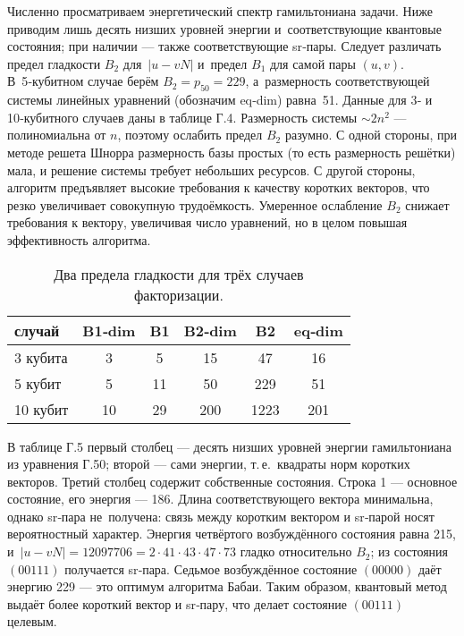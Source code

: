 Численно просматриваем энергетический спектр гамильтониана задачи. Ниже
приводим лишь десять низших уровней энергии и~соответствующие квантовые
состояния; при наличии — также соответствующие sr‑пары. Следует различать
предел гладкости $B_{2}$ для~$|u-vN|$ и~предел $B_{1}$ для самой пары $(u,v)$.
В~5‑кубитном случае берём $B_{2}=p_{50}=229$, а~размерность соответствующей
системы линейных уравнений (обозначим eq‑dim) равна~51. Данные для 3‑ и
10‑кубитного случаев даны в таблице Г.4. Размерность системы $\sim 2n^{2}$ —
полиномиальна от $n$, поэтому ослабить предел $B_{2}$ разумно. С одной стороны,
при методе решета Шнорра размерность базы простых (то есть размерность решётки)
мала, и решение системы требует небольших ресурсов. С другой стороны, алгоритм
предъявляет высокие требования к качеству коротких векторов, что резко
увеличивает совокупную трудоёмкость. Умеренное ослабление $B_{2}$ снижает
требования к вектору, увеличивая число уравнений, но в целом повышая
эффективность алгоритма.

\begin{table}[h]
    \centering
    \caption{
Два предела гладкости для трёх случаев факторизации.
    }
\begin{tabular}{@{}lccccc@{}}
\hline\hline
\textbf{случай} & \textbf{B1‑dim} & \textbf{B1} &
\textbf{B2‑dim} & \textbf{B2} & \textbf{eq‑dim} \\ \hline
3 кубита  & 3  &  5 &  15 &   47 &  16 \\
5 кубит   & 5  & 11 &  50 &  229 &  51 \\
10 кубит  & 10 & 29 & 200 & 1223 & 201 \\
\hline\hline
\end{tabular}
    \label{tab:tab6}
\end{table}

В таблице Г.5 первый столбец — десять низших уровней энергии гамильтониана
из уравнения Г.50; второй — сами энергии, т.\,е.\ квадраты норм коротких
векторов. Третий столбец содержит собственные состояния. Строка 1 — основное
состояние, его энергия — 186. Длина соответствующего вектора минимальна, однако
sr‑пара не~получена: связь между коротким вектором и sr‑парой носят
вероятностный характер. Энергия четвёртого возбуждённого состояния равна 215,
и~$|u-vN|=12097706= 2\!\cdot\!41\!\cdot\!43\!\cdot\!47\!\cdot\!73$ гладко
относительно $B_{2}$; из состояния $(00111)$ получается sr‑пара. Седьмое
возбуждённое состояние $(00000)$ даёт энергию 229 — это оптимум алгоритма
Бабаи. Таким образом, квантовый метод выдаёт более короткий вектор и sr‑пару,
что делает состояние $(00111)$ целевым.

